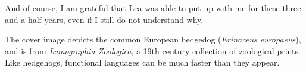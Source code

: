 And of course, I am grateful that Lea was able to put up with me for
these three and a half years, even if I still do not understand why.

The cover image depicts the common European hedgedog
(\textit{Erinaceus europaeus}), and is from \textit{Iconographia
  Zoologica}, a 19th century collection of zoological prints.  Like
hedgehogs, functional languages can be much faster than they appear.

